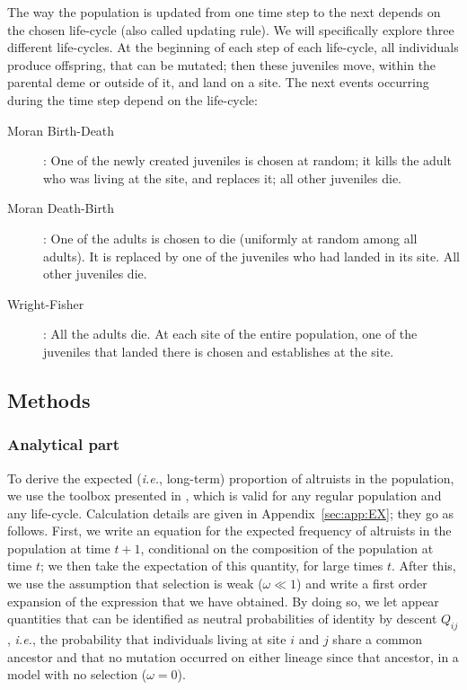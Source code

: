\documentclass[11pt, letterpaper]{article}
\newcommand{\ie}{\textit{i.e.}}
\newcommand{\appname}[0]{Appendix}
\begin{document}
The way the population is updated from one time step to the next depends on the chosen life-cycle (also called updating rule). We will specifically explore three different life-cycles. At the beginning of each step of each life-cycle, all individuals produce offspring, that can be mutated; then these juveniles move, within the parental deme or outside of it, and land on a site. The next events occurring during the time step depend on the life-cycle:
\begin{description}
\item[Moran Birth-Death]: One of the newly created juveniles is chosen at random; it kills the adult who was living at the site, and replaces it; all other juveniles die. 
\item[Moran Death-Birth]: One of the adults is chosen to die (uniformly at random among all adults). It is replaced by one of the juveniles who had landed in its site. All other juveniles die. 
\item[Wright-Fisher]: All the adults die. At each site of the entire population, one of the juveniles that landed there is chosen and establishes at the site. 
\end{description}
  
\subsection{Methods}
\subsubsection{Analytical part}

To derive the expected (\ie, long-term) proportion of altruists in the population, we use the toolbox presented in \citet{Debarre2017}, which is valid for any regular population and any life-cycle. Calculation details are given in \appname~\ref{sec:app:EX}; they go as follows. First, we write an equation for the expected frequency of altruists in the population at time $t+1$, conditional on the composition of the population at time $t$; we then take the expectation of this quantity, for large times $t$. After this, we use the assumption that selection is weak ($\omega \ll 1$) and write a first order expansion of the expression that we have obtained. By doing so, we let appear quantities that can be identified as neutral probabilities of identity by descent $Q_{ij}$, \ie, the probability that individuals living at site $i$  and $j$ share a common ancestor and that no mutation occurred on either lineage since that ancestor, in a model with no selection ($\omega=0$). 
\end{document}

